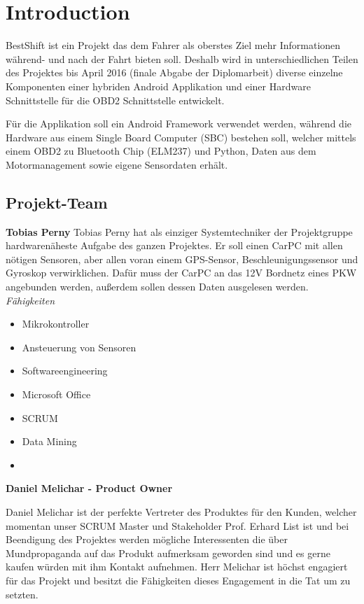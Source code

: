 \chapter{Introduction}
BestShift ist ein Projekt das dem Fahrer als oberstes Ziel mehr Informationen während- und nach der Fahrt bieten soll. Deshalb wird in unterschiedlichen Teilen des Projektes bis April 2016 (finale Abgabe der Diplomarbeit) diverse einzelne Komponenten einer hybriden Android Applikation und einer Hardware Schnittstelle für die OBD2 Schnittstelle entwickelt. 

Für die Applikation soll ein Android Framework verwendet werden, während die Hardware aus einem Single Board Computer (SBC) bestehen soll, welcher mittels einem OBD2 zu Bluetooth Chip (ELM237) und Python, Daten aus dem Motormanagement sowie eigene Sensordaten erhält. 

\section{Projekt-Team}
\textbf{Tobias Perny}
Tobias Perny hat als einziger Systemtechniker der Projektgruppe hardwarenäheste Aufgabe des ganzen Projektes. Er soll einen CarPC mit allen nötigen Sensoren, aber allen voran einem GPS-Sensor, Beschleunigungssensor und Gyroskop verwirklichen. Dafür muss der CarPC an das 12V Bordnetz eines PKW angebunden werden, außerdem sollen dessen Daten ausgelesen werden. 
\textit{Fähigkeiten}
\begin{itemize}
	\item Mikrokontroller
	\item Ansteuerung von Sensoren		
	\item Softwareengineering
	\item Microsoft Office
	\item SCRUM
	\item Data Mining
	\item {}
\end{itemize}

\textbf{Daniel Melichar - Product Owner}

Daniel Melichar ist der perfekte Vertreter des Produktes für den Kunden, welcher momentan unser SCRUM Master und Stakeholder Prof. Erhard List ist und bei Beendigung des Projektes werden mögliche Interessenten die über Mundpropaganda auf das Produkt aufmerksam geworden sind und es gerne kaufen würden mit ihm Kontakt aufnehmen. Herr Melichar ist höchst engagiert für das Projekt und besitzt die Fähigkeiten dieses Engagement in die Tat um zu setzten.

